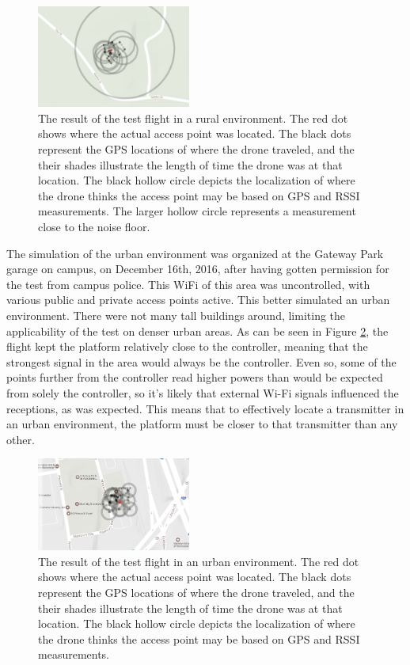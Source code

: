 \documentclass[journal,transmag]{IEEEtran}
\begin{document}
\begin{figure}[ht!]
  \centering
  \includegraphics[width=0.45\textwidth]{img/ruraltest.png}
  \caption{The result of the test flight in a rural environment. The red dot shows where the actual access point was located. The black dots represent the GPS locations of where the drone traveled, and the their shades illustrate the length of time the drone was at that location. The black hollow circle depicts the localization of where the drone thinks the access point may be based on GPS and RSSI measurements. The larger hollow circle represents a measurement close to the noise floor.}
  \label{fig:rural_test}
\end{figure} \par
The simulation of the urban environment was organized at the Gateway Park garage on campus, on December 16th, 2016, after having gotten permission for the test from campus police. This WiFi of this area was uncontrolled, with various public and private access points active. This better simulated an urban environment. There were not many tall buildings around, limiting the applicability of the test on denser urban areas. As can be seen in Figure \ref{fig:urban_test}, the flight kept the platform relatively close to the controller, meaning that the strongest signal in the area would always be the controller. Even so, some of the points further from the controller read higher powers than would be expected from solely the controller, so it's likely that external Wi-Fi signals influenced the receptions, as was expected. This means that to effectively locate a transmitter in an urban environment, the platform must be closer to that transmitter than any other.
\begin{figure}[ht!]
    \centering
    \includegraphics[width=0.45\textwidth]{img/urban_test_map.png}
    \caption{The result of the test flight in an urban environment. The red dot shows where the actual access point was located. The black dots represent the GPS locations of where the drone traveled, and the their shades illustrate the length of time the drone was at that location. The black hollow circle depicts the localization of where the drone thinks the access point may be based on GPS and RSSI measurements.}
    \label{fig:urban_test}
\end{figure} \par
\end{document}
